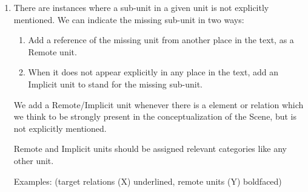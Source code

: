 \documentclass[11pt]{article}
\newcommand{\be}{\begin{enumerate}}
\newcommand{\ee}{\end{enumerate}}
\newcommand{\orig}[1]{{\color{red} {#1}}}
\begin{document}
\begin{enumerate}
  
\item

There are instances where a sub-unit in a given unit is not explicitly mentioned. We can indicate the missing sub-unit in two ways:
\be
\item Add a reference of the missing unit from another place in the text, as a Remote unit.
\item When it does not appear explicitly in any place in the text, add an Implicit unit to stand for the missing sub-unit.  \ee

We add a Remote/Implicit unit whenever there is a element or relation which we think to be strongly present in the conceptualization of the Scene, but is not explicitly mentioned. 


Remote and Implicit units should be assigned relevant categories like any other unit.




Examples: (target relations (X) underlined, remote units (Y) boldfaced)


\end{enumerate}
\end{document}
